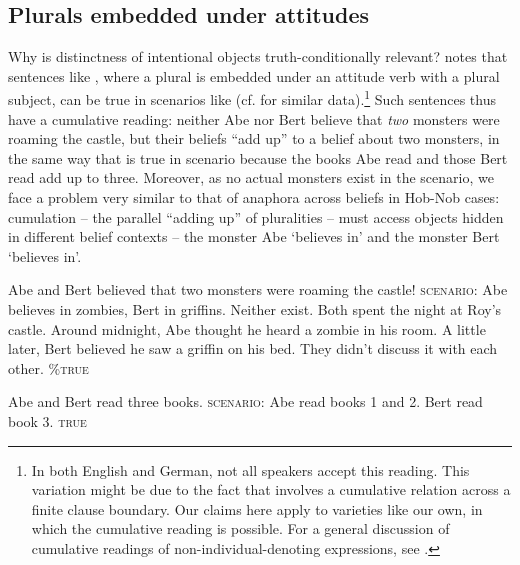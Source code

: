 \documentclass[output=paper]{langscibook}
\begin{document}
\subsection{Plurals embedded under attitudes}\label{sch-has:sec:2.1}

Why is distinctness of intentional objects truth-conditionally relevant? \citet{Schmitt:2019a} notes that sentences like , where a plural is embedded under an attitude verb with a plural subject, can be true in scenarios like   (cf. \citealt{Pasternak:2018a} for similar data).\footnote{In both English and German, not all speakers accept this reading. This variation might be due to the fact that  involves a cumulative relation across a finite clause boundary. Our claims here apply to varieties like our own, in which the cumulative reading is possible. For a general discussion of cumulative readings of non-individual-denoting expressions, see \citet{Schmitt:2019}.} Such sentences thus have a cumulative reading: neither Abe nor Bert believe that \textit{two} monsters were roaming the castle, but their beliefs ``add up'' to a belief about two monsters, in the same way that  is true in scenario  because the books Abe read and those Bert read add up to three. Moreover, as no actual monsters exist in the scenario, we face a problem very similar to that of anaphora across beliefs in Hob-Nob cases: cumulation -- the parallel ``adding up'' of pluralities -- must access objects hidden in different belief contexts -- the monster Abe `believes in' and the monster Bert `believes in'.

\eanoraggedright
\eanoraggedright \label{sch-has:ex:6} Abe and Bert  believed that two monsters were roaming the castle! %
  \ex\label{sch-has:ex:7} \textsc{scenario:} Abe believes in zombies, Bert in griffins. Neither exist. Both spent the night at Roy's castle.  Around midnight, Abe thought he heard a zombie in his room. A little later, Bert believed he saw a griffin  on his bed. They didn't discuss it with each other.  %
\hfill {} \textsc{\%true}
\z\z

\ea
\ea \label{sch-has:ex:6a} Abe and Bert read three books. %
\ex \label{sch-has:ex:7a} \textsc{scenario:} Abe read books 1 and 2. Bert read book 3. \hfill {} \textsc{true} 
\z\z
\end{document}
